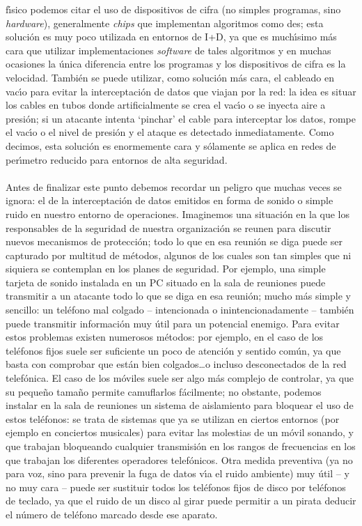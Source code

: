 f\'{\i}sico podemos citar
el uso de dispositivos de cifra (no simples programas, sino {\it hardware}),
generalmente {\it chips} que implementan algoritmos como {\sc des}; esta 
soluci\'on es muy poco utilizada en entornos de I+D, ya que es much\'{\i}simo 
m\'as cara que utilizar implementaciones {\it software} de tales algoritmos y
en muchas ocasiones la \'unica diferencia entre los programas y los dispositivos
de cifra es la velocidad. Tambi\'en se puede utilizar, como soluci\'on m\'as
cara, el cableado en vac\'{\i}o para evitar la interceptaci\'on de datos que
viajan por la red: la idea es situar los cables en tubos donde artificialmente
se crea el vac\'{\i}o o se inyecta aire a presi\'on; si un atacante intenta
`pinchar' el cable para interceptar los datos, rompe el vac\'{\i}o o el nivel
de presi\'on y el ataque es detectado inmediatamente. Como decimos, esta 
soluci\'on es enormemente cara y s\'olamente se aplica en redes de 
per\'{\i}metro reducido para entornos de alta seguridad.\\
\\Antes de finalizar este punto debemos recordar un peligro que
muchas veces se ignora: el de la interceptaci\'on de datos emitidos en forma de
sonido o simple ruido en nuestro entorno de operaciones. Imaginemos una 
situaci\'on en la que los responsables de la seguridad de nuestra organizaci\'on
se reunen para discutir nuevos mecanismos de protecci\'on; todo lo que en esa
reuni\'on se diga puede ser capturado por multitud de m\'etodos, algunos de los
cuales son tan simples que ni siquiera se contemplan en los planes de seguridad.
Por ejemplo, una simple tarjeta de sonido instalada en un PC situado en la sala
de reuniones puede transmitir a un atacante todo lo que se diga en esa 
reuni\'on; mucho m\'as simple y sencillo: un tel\'efono mal 
colgado -- intencionada o inintencionadamente -- tambi\'en puede transmitir 
informaci\'on muy \'util para un potencial enemigo. Para evitar estos problemas
existen numerosos m\'etodos: por ejemplo, en el caso de los tel\'efonos fijos
suele ser suficiente un poco de atenci\'on y sentido com\'un, ya que basta con
comprobar que est\'an bien colgados\ldots o incluso desconectados de la red
telef\'onica. El caso de los m\'oviles suele ser algo m\'as complejo de 
controlar, ya que su peque\~no tama\~no permite camuflarlos f\'acilmente; no 
obstante, podemos instalar en la sala de reuniones un sistema de aislamiento 
para bloquear el uso de estos tel\'efonos: se trata de sistemas que ya se 
utilizan en ciertos entornos (por ejemplo en conciertos musicales) para evitar 
las molestias de un m\'ovil sonando, y que trabajan bloqueando cualquier 
transmisi\'on en los rangos de frecuencias en los que trabajan los diferentes
operadores telef\'onicos. Otra medida preventiva (ya no para voz, sino para 
prevenir la fuga de datos v\'{\i}a el ruido ambiente) muy \'util -- y no muy 
cara -- puede ser sustituir todos los tel\'efonos fijos de disco por 
tel\'efonos de teclado, ya que el ruido de un disco al girar puede permitir a 
un pirata deducir el n\'umero de tel\'efono marcado desde ese aparato.
